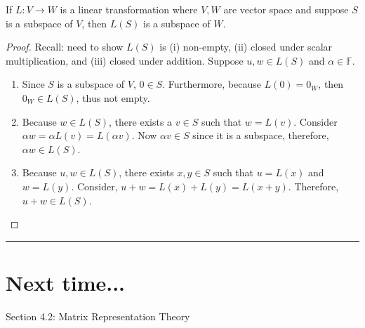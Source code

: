 \begin{theorem}
 If $L:V \to W$ is a linear transformation where $V, W$ are vector space and suppose $S$ is a subspace of $V$, then $L(S)$ is a subspace of $W$.  
 
 \begin{proof}
 Recall: need to show $L(S)$ is (i) non-empty, (ii) closed under scalar multiplication, and (iii) closed under addition.   Suppose $u, w \in L(S)$ and $\alpha \in \mathbb{F}$. 
 
 \begin{enumerate}
 	\item Since $S$ is a subspace of $V$, $0 \in S$.  Furthermore, because $L(0) = 0_W$, then $0_W \in L(S)$, thus not empty.   
	
	\item Because $w \in  L(S)$, there exists a $v \in S$ such that $w = L(v)$.  Consider $\alpha w  = \alpha L( v) =  L(\alpha v) $.  Now $\alpha v \in S$ since it is a subspace, therefore, $\alpha w \in L(S)$.    
		
	\item Because $u, w \in L(S)$, there exists $x,y \in S$ such that $u=L(x)$ and $w=L(y)$.  Consider, $u+w = L(x) + L(y) = L(x+y)$.  Therefore, $u+w \in L(S)$.
	
	
 \end{enumerate}
 \end{proof}  
\end{theorem}

\rule[0.01in]{\textwidth}{0.0025in}









\section*{Next time...}
Section 4.2: Matrix Representation Theory

